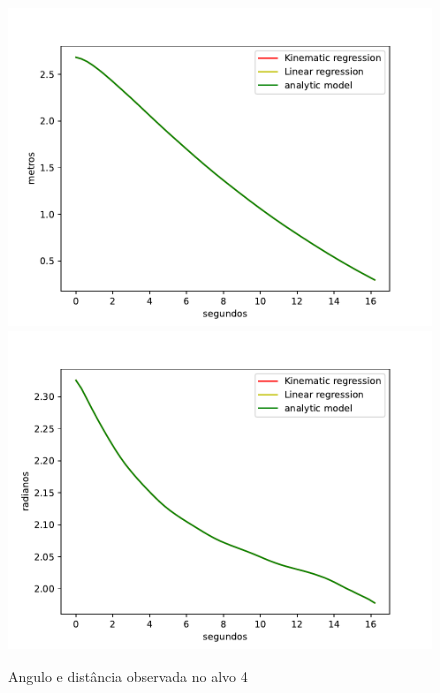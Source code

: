 \begin{figure}[H]
    \centering
    \includegraphics[scale=0.3]{figuras/distance_over_time_4.pdf}
    \hspace{1cm}
    \includegraphics[scale=0.3]{figuras/angle_over_time_4.pdf}
    \caption{Angulo e distância observada no alvo 4}
\end{figure}

